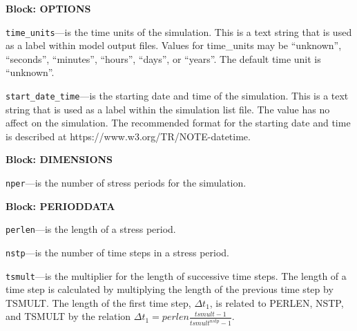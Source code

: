 
\item \textbf{Block: OPTIONS}

\begin{description}
\item \texttt{time\_units}---is the time units of the simulation.  This is a text string that is used as a label within model output files.  Values for time\_units may be ``unknown'',  ``seconds'', ``minutes'', ``hours'', ``days'', or ``years''.  The default time unit is ``unknown''.

\item \texttt{start\_date\_time}---is the starting date and time of the simulation.  This is a text string that is used as a label within the simulation list file.  The value has no affect on the simulation.  The recommended format for the starting date and time is described at https://www.w3.org/TR/NOTE-datetime.

\end{description}
\item \textbf{Block: DIMENSIONS}

\begin{description}
\item \texttt{nper}---is the number of stress periods for the simulation.

\end{description}
\item \textbf{Block: PERIODDATA}

\begin{description}
\item \texttt{perlen}---is the length of a stress period.

\item \texttt{nstp}---is the number of time steps in a stress period.

\item \texttt{tsmult}---is the multiplier for the length of successive time steps. The length of a time step is calculated by multiplying the length of the previous time step by TSMULT. The length of the first time step, $\Delta t_1$, is related to PERLEN, NSTP, and TSMULT by the relation $\Delta t_1= perlen \frac{tsmult - 1}{tsmult^{nstp}-1}$.

\end{description}

